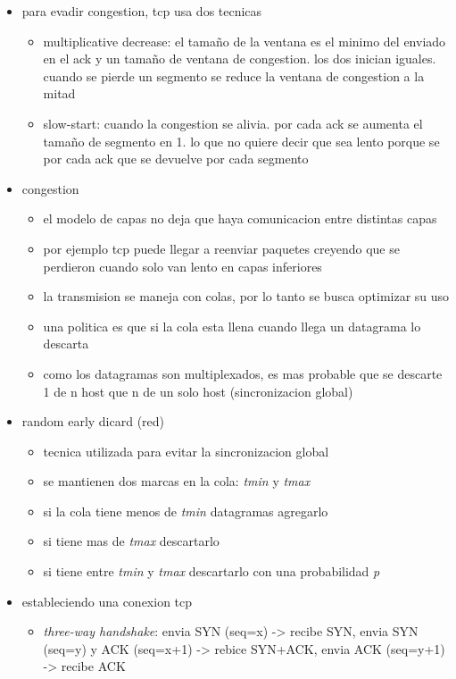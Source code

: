 \documentclass[11pt]{article}
\begin{document}
\begin{itemize}
\begin{itemize}
\end{itemize}
\item para evadir congestion, tcp usa dos tecnicas
\begin{itemize}
\item multiplicative decrease: el tamaño de la ventana es el minimo del enviado en el ack y un tamaño de ventana de congestion. los dos inician iguales. cuando se pierde un segmento se reduce la ventana de congestion a la mitad
\item slow-start: cuando la congestion se alivia. por cada ack se aumenta el tamaño de segmento en 1. lo que no quiere decir que sea lento porque se por cada ack que se devuelve por cada segmento
\end{itemize}
\item congestion
\begin{itemize}
\item el modelo de capas no deja que haya comunicacion entre distintas capas
\item por ejemplo tcp puede llegar a reenviar paquetes creyendo que se perdieron cuando solo van lento en capas inferiores
\item la transmision se maneja con colas, por lo tanto se busca optimizar su uso
\item una politica es que si la cola esta llena cuando llega un datagrama lo descarta
\item como los datagramas son multiplexados, es mas probable que se descarte 1 de n host que n de un solo host (sincronizacion global)
\end{itemize}
\item random early dicard (red)
\begin{itemize}
\item tecnica utilizada para evitar la sincronizacion global
\item se mantienen dos marcas en la cola: \emph{tmin} y \emph{tmax}
\item si la cola tiene menos de \emph{tmin} datagramas agregarlo
\item si tiene mas de \emph{tmax} descartarlo
\item si tiene entre \emph{tmin} y \emph{tmax} descartarlo con una probabilidad \emph{p}
\end{itemize}
\item estableciendo una conexion tcp
\begin{itemize}
\item \emph{three-way handshake}: envia SYN (seq=x) -> recibe SYN, envia SYN (seq=y) y ACK (seq=x+1) -> rebice SYN+ACK, envia ACK (seq=y+1) -> recibe ACK

\end{itemize}
\end{itemize}
\end{document}
